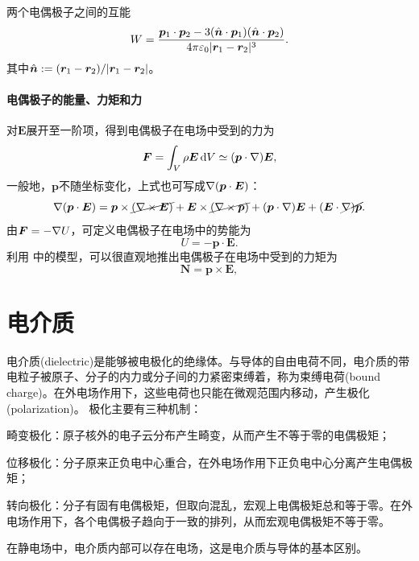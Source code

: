 \begin{example}
    {两个电偶极子之间的互能}{}
    \begin{equation}
        W = \frac{\bm p_1 \cdot \bm p_2 - 3(\mathop{}\!\hat{\bm{n}} \cdot \bm p_1)(\mathop{}\!\hat{\bm{n}} \cdot \bm p_2)}{4\pi\varepsilon_0\lvert\bm r_1 - \bm r_2\rvert^3}.
    \end{equation}
    其中$\mathop{}\!\hat{\bm{n}} := (\bm r_1 - \bm r_2)/\lvert\bm r_1 - \bm r_2\rvert$。
\end{example}

\paragraph{电偶极子的能量、力矩和力}

对$\bm E$展开至一阶项，得到电偶极子在电场中受到的力为
\begin{equation}
    \label{eqn:F=(p dot nabla)E}
    \bm F = \int_V\rho\bm E\mathop{}\!\mathrm{d} V \simeq (\bm p \cdot \nabla)\bm E,
\end{equation}
一般地，$\bm p$不随坐标变化，上式也可写成$\nabla(\bm p \cdot \bm E)$：
\[
    \nabla(\bm p \cdot \bm E) = \bm p \times \cancel{(\nabla\times\bm E)} + \bm E \times \cancel{(\nabla\times\bm p)} + (\bm p \cdot \nabla)\bm E + (\bm E \cdot \cancel{\nabla)\bm p}.
\]
由$\bm F = -\nabla U$，可定义电偶极子在电场中的势能为
\begin{equation}
    U = -\bm p \cdot \bm E.
\end{equation}
利用 中的模型，可以很直观地推出电偶极子在电场中受到的力矩为
\begin{equation}
    \bm N = \bm p \times \bm E,
\end{equation}

\section{电介质}
\label{sec:dielectric}

电介质(dielectric)是能够被电极化的绝缘体。与导体的自由电荷不同，电介质的带电粒子被原子、分子的内力或分子间的力紧密束缚着，称为束缚电荷(bound charge)。在外电场作用下，这些电荷也只能在微观范围内移动，产生极化(polarization)。
极化主要有三种机制：
\begin{compactenum}
    \item 畸变极化：原子核外的电子云分布产生畸变，从而产生不等于零的电偶极矩；
    \item 位移极化：分子原来正负电中心重合，在外电场作用下正负电中心分离产生电偶极矩；
    \item 转向极化：分子有固有电偶极矩，但取向混乱，宏观上电偶极矩总和等于零。在外电场作用下，各个电偶极子趋向于一致的排列，从而宏观电偶极矩不等于零。
\end{compactenum}
在静电场中，电介质内部可以存在电场，这是电介质与导体的基本区别。
